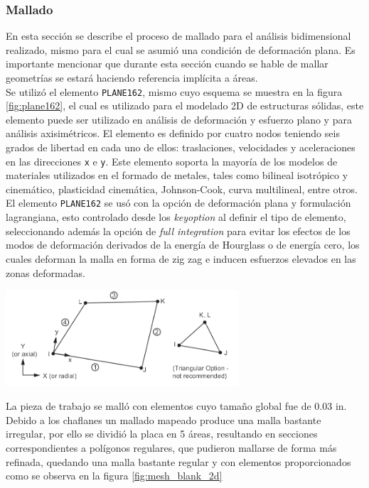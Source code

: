 \subsubsection{Mallado}

En esta sección se describe el proceso de mallado para el análisis bidimensional realizado, 
mismo para el cual se asumió una condición de deformación plana. Es importante mencionar 
que durante esta sección cuando se hable de mallar geometrías se estará haciendo referencia 
implícita a áreas.\\

Se utilizó el elemento \texttt{PLANE162}, mismo cuyo esquema se muestra en la figura \ref{fig:plane162}, 
el cual es utilizado para el modelado 2D de estructuras sólidas, este elemento puede ser utilizado en 
análisis de deformación y esfuerzo plano y para análisis axisimétricos. El elemento es definido por 
cuatro nodos teniendo seis grados de libertad en cada uno de ellos: traslaciones, velocidades y 
aceleraciones en las direcciones \texttt{x} e \texttt{y}. Este elemento soporta la mayoría de los modelos 
de materiales utilizados en el formado de metales, tales como bilineal isotrópico y cinemático, plasticidad 
cinemática, Johnson-Cook, curva multilineal, entre otros. \\

El elemento \texttt{PLANE162} se usó con la opción de deformación plana y formulación lagrangiana, esto controlado 
desde los \textit{keyoption} al definir el tipo de elemento, seleccionando además la opción de \textit{full integration} 
para evitar los efectos de los modos de deformación derivados de la energía de Hourglass o de energía cero, los cuales 
deforman la malla en forma de zig zag e inducen esfuerzos elevados en las zonas deformadas.\\

\begin{center}
\includegraphics[width=0.65\textwidth]{src/ch3/plane162.png}
\label{fig:plane162}
\end{center}

La pieza de trabajo se malló con elementos cuyo tamaño global fue de 0.03 in. Debido a los chaflanes 
un mallado mapeado produce una malla bastante irregular, por ello se dividió la placa en 5 áreas, resultando 
en secciones correspondientes a polígonos regulares, que pudieron mallarse de forma más refinada, 
quedando una malla bastante regular y con elementos proporcionados como se observa en la figura \ref{fig:mesh_blank_2d}

